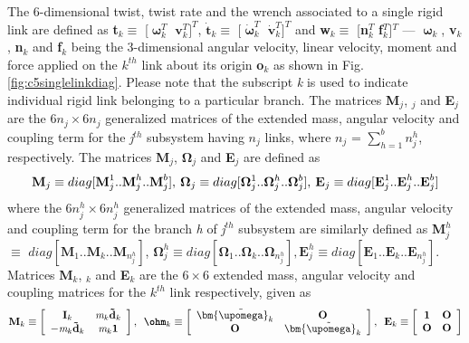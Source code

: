 The 6-dimensional twist, twist rate and the wrench associated to a single rigid link are defined as \textbf{t}$_k \equiv$ [$\bm{\upomega}_k^T$ $\textbf{v}_k^T]^T$, $\dot{\textbf{t}}_k \equiv$ [$\dot{\bm{\upomega}}_k^T$ $\dot{\textbf{v}}_k^T]^T$ and \textbf{w}$_k \equiv$ [\textbf{n}$_k^T$ \textbf{f}$_k^T$]$^T$ --- $\bm{\upomega}_k$, \textbf{v}$_k$, \textbf{n}$_k$ and \textbf{f}$_k$ being the 3-dimensional angular velocity, linear velocity, moment and force applied on the $k^{th}$ link about its origin \textbf{o}$_k$ as shown in Fig. \ref{fig:c5singlelinkdiag}. Please note that the subscript \emph{k} is used to indicate individual rigid link belonging to a particular branch. The matrices \textbf{M}$_j$, \textbf{\ohm}$_j$ and \textbf{E}$_j$ are the $6n_j\times6n_j$ generalized matrices of the extended mass, angular velocity and coupling term for the \emph{j}$^{th}$ subsystem having $n_j$ links, where $n_j$ = $\sum\limits_{h=1}^{b}n_j^h$, respectively. The matrices \textbf{M}$_j$, $\mathbf{\Omega}_{j}$ and \textbf{E}$_{j}$ are defined as
\begin{eqnarray}
\textbf{M}_j \equiv diag[\textbf{M}_{j}^{1}..\textbf{M}_{j}^{h}..\textbf{M}_{j}^{b}], \hspace*{2pt}\mathbf{\Omega}_j \equiv diag[\mathbf{\Omega}_{j}^{1}..\mathbf{\Omega}_{j}^{h}..\mathbf{\Omega}_{j}^{b}], \hspace*{2pt}\textbf{E}_j \equiv diag[\textbf{E}_{j}^{1}..\textbf{E}_{j}^{h}..\textbf{E}_{j}^{b}]
\end{eqnarray}
where the 6${n_{j}^{h}}\times$6${n_{j}^{h}}$ generalized matrices of the extended mass, angular velocity and coupling term for the branch \emph{h} of \emph{j}$^{th}$ subsystem are similarly defined as \textbf{M}$_j^h$ $\equiv$ $diag[\textbf{M}_{1}..\textbf{M}_{k}..\textbf{M}_{n_{j}^{h}}]$, $\mathbf{\Omega}_j^h \equiv diag[\mathbf{\Omega}_{1}..\mathbf{\Omega}_{k}..\mathbf{\Omega}_{n_{j}^{h}}], \textbf{E}_j^h \equiv diag[\textbf{E}_{1}..\textbf{E}_{k}..\textbf{E}_{n_{j}^{h}}]$. Matrices \textbf{M}$_k$, \textbf{\ohm}$_k$ and \textbf{E}$_k$ are the $6\times6$ extended mass, angular velocity and coupling matrices for the $k^{th}$ link respectively, given as
\begin{equation}
\label{eqn:MkOkEk}
\textbf{M}_k \equiv 
\left[ \begin{array}{cc}
\textbf{I}_k & \textit{m}_k\mathbf{\tilde d}_k\\
-\textit{m}_k\mathbf{\tilde d}_k & \textit{m}_k\textbf{1}\\
\end{array} \right],\hspace*{5pt}
\textbf{\ohm$_k$} \equiv 
\left[ \begin{array}{cc}
\bm{\tilde\upomega}_k & \textbf{O} \\
\textbf{O} & \bm{\tilde\upomega}_k \\
\end{array} \right],\hspace*{5pt}
\textbf{E}_k \equiv 
\left[ \begin{array}{cc}
\textbf{1} & \textbf{O} \\
\textbf{O} & \textbf{O} 
\end{array} \right]
\end{equation}
